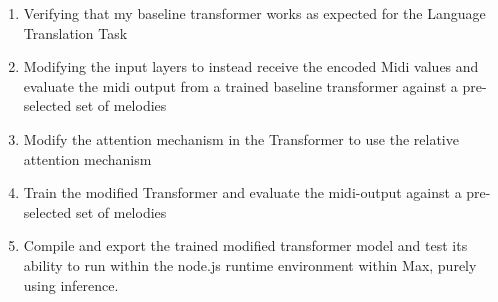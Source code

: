 \documentclass[../main.tex]{subfiles}
\begin{document}
\begin{enumerate}
    \item Verifying that my baseline transformer works as expected for the Language Translation Task

    \item Modifying the input layers to instead receive the encoded Midi values and evaluate the midi output from a trained baseline transformer against a pre-selected set of melodies

    \item Modify the attention mechanism in the Transformer to use the relative attention mechanism
    
    \item Train the modified Transformer and evaluate the midi-output against a pre-selected set of melodies

    \item Compile and export the trained modified transformer model and test its ability to run within the node.js runtime environment within Max, purely using inference.
\end{enumerate}
\end{document}

